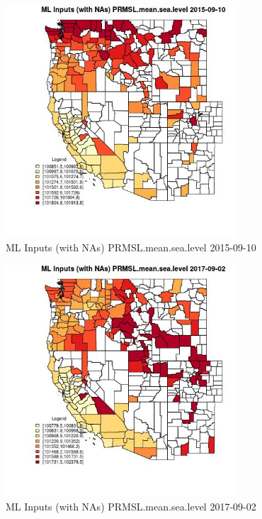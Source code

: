 \begin{figure} 
\centering  
\includegraphics[width=0.77\textwidth]{Code_Outputs/Report_ML_input_PM25_Step4_part_e_de_duplicated_aves_compiled_2019-05-20wNAs_CountyPRMSLmeansealevelMean2015-09-10.jpg} 
\caption{\label{fig:Report_ML_input_PM25_Step4_part_e_de_duplicated_aves_compiled_2019-05-20wNAsCountyPRMSLmeansealevelMean2015-09-10}ML Inputs (with NAs) PRMSL.mean.sea.level 2015-09-10} 
\end{figure} 
 

\begin{figure} 
\centering  
\includegraphics[width=0.77\textwidth]{Code_Outputs/Report_ML_input_PM25_Step4_part_e_de_duplicated_aves_compiled_2019-05-20wNAs_CountyPRMSLmeansealevelMean2017-09-02.jpg} 
\caption{\label{fig:Report_ML_input_PM25_Step4_part_e_de_duplicated_aves_compiled_2019-05-20wNAsCountyPRMSLmeansealevelMean2017-09-02}ML Inputs (with NAs) PRMSL.mean.sea.level 2017-09-02} 
\end{figure} 
 

